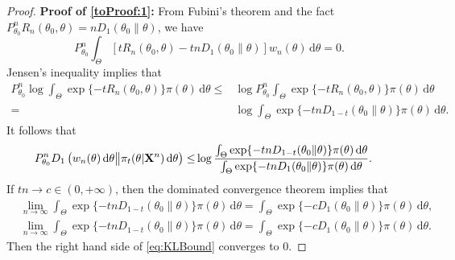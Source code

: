\documentclass[11pt]{article}
\theoremstyle{plain}
\theoremstyle{definition}
\theoremstyle{remark}
\begin{document}
\begin{appendices}
\begin{proof}
\noindent\textbf{Proof of \eqref{toProof:1}:}
From Fubini's theorem and the fact $P_{\theta_0}^n R_n (\theta_0, \theta) = n D_1 (\theta_0 \| \theta)$, we have
\begin{equation*}
P_{\theta_0}^n\int_{\Theta}
    \left[   t R_n(\theta_0, \theta) - tn D_1 (\theta_0 \| \theta )  \right]
    w_n (\theta) \, \mathrm d \theta
    =0
    .
\end{equation*}
Jensen's inequality implies that
\begin{align*}
    P_{\theta_0}^n \log \int_{\Theta} \exp \{-t R_n (\theta_0, \theta)\} \pi (\theta) \, \mathrm d \theta  
    \leq &
    \log 
    P_{\theta_0}^n
    \int_{\Theta} \exp \{-t R_n (\theta_0, \theta)\} \pi (\theta) \, \mathrm d \theta  
    \\
    =&
    \log 
    \int_{\Theta} \exp \{-tn D_{1-t}(\theta_0 \| \theta)\} \pi (\theta) \, \mathrm d \theta.
\end{align*}
It follows that
\begin{align}
    P_{\theta_0}^n
     D_1\left( 
        w_n (\theta) \, \mathrm d \theta
        \big\|
        \pi_t (\theta | \mathbf{X}^{n}) \, \mathrm d \theta
    \right)
    \leq &
    \log \frac{
        \int_{\Theta} \exp \{-tn D_{1-t}(\theta_0 \| \theta)\} \pi (\theta) \, \mathrm d \theta
    }
    {
    \int_{\Theta} \exp \{-tn D_{1}(\theta_0 \| \theta)\} \pi (\theta) \, \mathrm d \theta
}.
\label{eq:KLBound}
\end{align}
If $tn\to c \in (0, +\infty)$, 
then the dominated convergence theorem implies that
\begin{align*}
    &
    \lim_{n\to \infty} \int_{\Theta} \exp \{-tn D_{1-t}(\theta_0 \| \theta)\} \pi (\theta) \, \mathrm d \theta
    =
    \int_{\Theta} \exp \{-c D_{1}(\theta_0 \| \theta)\} \pi (\theta) \, \mathrm d \theta,
    \\
    &
    \lim_{n\to \infty} \int_{\Theta} \exp \{-tn D_{1-t}(\theta_0 \| \theta)\} \pi (\theta) \, \mathrm d \theta
    =
    \int_{\Theta} \exp \{-c D_{1}(\theta_0 \| \theta)\} \pi (\theta) \, \mathrm d \theta
    .
\end{align*}
Then the right hand side of \eqref{eq:KLBound} converges to $0$.


\end{proof}
\end{appendices}
\end{document}
